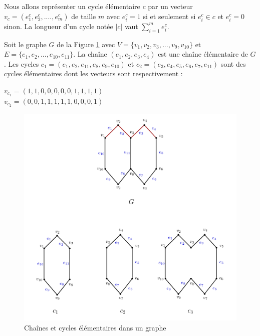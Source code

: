 Nous allons représenter un cycle élémentaire $c$ par un vecteur $v_c = (e_1^{c}, e_2^{c}, ...., e_m^{c})$ de taille $m$ avec $e_i^c = 1$ si et seulement si $e_i^c \in c$ et $e_i^c = 0$ sinon. La longueur d'un cycle notée $|c|$ vaut $\sum_{i = 1}^{m}e_i^c$.

\begin{exemple}
\label{exemplecycles}
Soit le graphe $G$ de la Figure \ref{chainescycles} avec $V = \{v_1, v_2, v_3, ...,v_9, v_{10}\}$ et $E = \{e_1, e_2, ...,e_{10}, e_{11}\}$. La chaîne $(e_1, e_2, e_3, e_4)$ est une chaîne élémentaire de $G$. Les cycles $c_1 =(e_1, e_2, e_{11}, e_8, e_9, e_{10})$ et $c_2 =(e_3, e_4, e_5, e_6, e_7,e_{11})$ sont des cycles élémentaires dont les vecteurs sont respectivement : 

\begin{center}
$v_{c_1} = (1, 1, 0, 0, 0, 0, 0, 1, 1, 1, 1)$\\
$v_{c_2} = (0, 0, 1, 1, 1, 1, 1, 0, 0, 0, 1)$

\end{center}
\begin{figure}[H]
\label{chainescycles}
\begin{center}
\includegraphics[scale=0.42]{chainescycles.png}
\end{center}
\caption{Chaînes et cycles élémentaires dans un graphe }
\end{figure}
\end{exemple}

